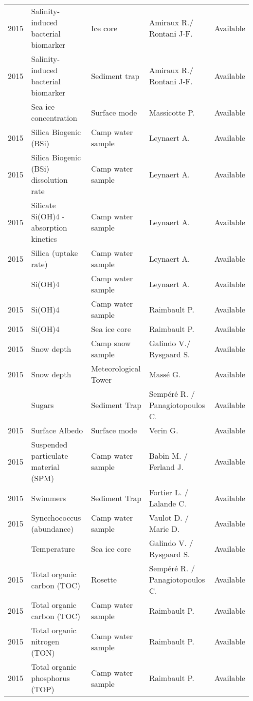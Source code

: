 \documentclass[]{article}
\begin{document}
\begin{landscape}
\begin{longtable}{rllll}
2015 & Salinity-induced bacterial biomarker & Ice core & Amiraux R./ Rontani J-F. & Available\\
2015 & Salinity-induced bacterial biomarker & Sediment trap & Amiraux R./ Rontani J-F. & Available\\
\addlinespace
2015 & Sea ice concentration & Surface mode & Massicotte P. & Available\\
2015 & Silica Biogenic (BSi) & Camp water sample & Leynaert A. & Available\\
2015 & Silica Biogenic (BSi) dissolution rate & Camp water sample & Leynaert A. & Available\\
2015 & Silicate Si(OH)4 - absorption kinetics & Camp water sample & Leynaert A. & Available\\
2015 & Silica (uptake rate) & Camp water sample & Leynaert A. & Available\\
\addlinespace
2015 & Si(OH)4 & Camp water sample & Leynaert A. & Available\\
2015 & Si(OH)4 & Camp water sample & Raimbault P. & Available\\
2015 & Si(OH)4 & Sea ice core & Raimbault P. & Available\\
2015 & Snow depth & Camp snow sample & Galindo V./ Rysgaard S. & Available\\
2015 & Snow depth & Meteorological Tower & Massé G. & Available\\
\addlinespace
2015 & Sugars & Sediment Trap & Sempéré R. / Panagiotopoulos C. & Available\\
2015 & Surface Albedo & Surface mode & Verin G. & Available\\
2015 & Suspended particulate material (SPM) & Camp water sample & Babin M. / Ferland J. & Available\\
2015 & Swimmers & Sediment Trap & Fortier L. / Lalande C. & Available\\
2015 & Synechococcus (abundance) & Camp water sample & Vaulot D. / Marie D. & Available\\
\addlinespace
2015 & Temperature & Sea ice core & Galindo V. / Rysgaard S. & Available\\
2015 & Total organic carbon (TOC) & Rosette & Sempéré R. / Panagiotopoulos C. & Available\\
2015 & Total organic carbon (TOC) & Camp water sample & Raimbault P. & Available\\
2015 & Total organic nitrogen (TON) & Camp water sample & Raimbault P. & Available\\
2015 & Total organic phosphorus (TOP) & Camp water sample & Raimbault P. & Available\\

\end{longtable}
\end{landscape}
\end{document}
